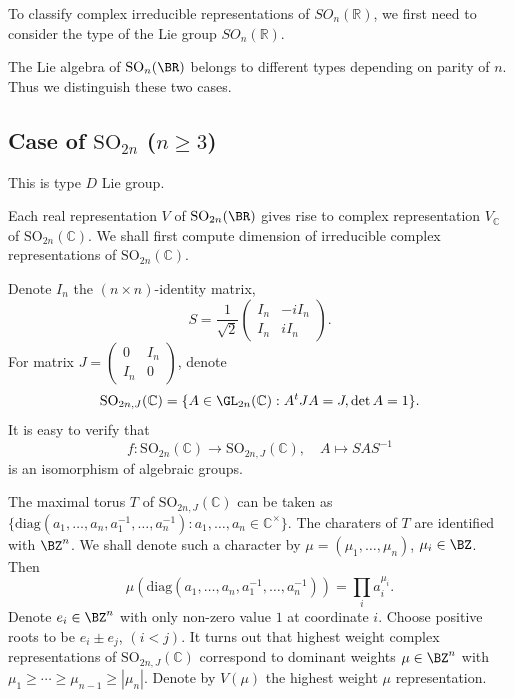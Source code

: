 \documentclass[a4paper]{amsart}
\newcommand{\BC}{{\mathbb {C}}} \newcommand{\BD}{{\mathbb {D}}}
\newcommand{\diag}{{\mathrm{diag}}}
\newcommand{\SO}{{\mathrm{SO}}}\newcommand{\so}{\mathfrak{so}}
\theoremstyle{plain}
\newtheorem{lem}[thm]{Lemma}
\theoremstyle{remark} \newtheorem{remark}[thm]{Remark}
\theoremstyle{remark} \newtheorem{exercise}{Exercise}
\theoremstyle{remark} \newtheorem{example}{Example}
\numberwithin{equation}{section}
\begin{document}


To classify complex irreducible representations of $SO_n(\mathbb{R})$, we first need to consider the type of the Lie group $SO_n(\mathbb{R})$.

The Lie algebra of $\SO_n(\BR)$ belongs to different types depending on parity of $n$. Thus we distinguish these two cases.

\subsection{Case of $\SO_{2n}$ ($n\geqslant 3$)}

This is type $D$ Lie group.

Each real representation $V$ of $\SO_{2n}(\BR)$ gives rise to complex representation $V_\BC$ of $\SO_{2n}(\BC)$. We shall first compute dimension of irreducible complex representations of $\SO_{2n}(\BC)$.

Denote $I_n$ the $(n\times n)$-identity matrix,
\[S=\frac{1}{\sqrt 2}\begin{pmatrix}I_n&-iI_n\\I_n&iI_n\end{pmatrix}.\]
For matrix $J=\begin{pmatrix}0&I_n\\I_n&0\end{pmatrix}$, denote
\[\SO_{2n,J}(\BC)=\{A\in\GL_{2n}(\BC):A^tJA=J,\det A=1\}.\]
It is easy to verify that
\begin{equation}\label{isom1}
    f:\SO_{2n}(\BC)\to\SO_{2n,J}(\BC),\quad A\mapsto SAS^{-1}
\end{equation}
is an isomorphism of algebraic groups.

The maximal torus $T$ of $\SO_{2n,J}(\BC)$ can be taken as $\{\diag(a_1,\ldots,a_n,a_1^{-1},\ldots,a_n^{-1}):a_1,\ldots,a_n\in\BC^\times\}$. The charaters of $T$ are identified with $\BZ^n$. We shall denote such a character by $\mu=(\mu_1,\ldots,\mu_n)$, $\mu_i\in\BZ$. Then
\[\mu(\diag(a_1,\ldots,a_n,a_1^{-1},\ldots,a_n^{-1}))=\prod_i a_i^{\mu_i}.\]
Denote $e_i\in\BZ^n$ with only non-zero value $1$ at coordinate $i$. Choose positive roots to be $e_i\pm e_j$, $(i<j)$. It turns out that highest weight complex representations of $\SO_{2n,J}(\BC)$ correspond to dominant weights $\mu\in\BZ^n$ with $\mu_1\geqslant\cdots\geqslant\mu_{n-1}\geqslant|\mu_n|$. Denote by $V(\mu)$ the highest weight $\mu$ representation.
\end{document}
